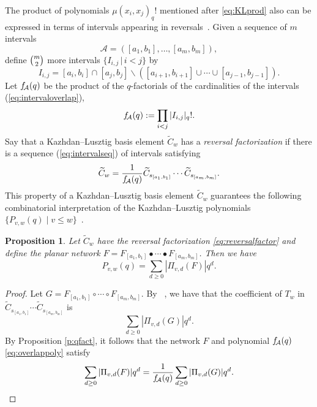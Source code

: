 \documentclass[12pt]{amsart}
\newtheorem{prop}[thm]{Proposition}
\theoremstyle{definition}
\numberwithin{equation}{section}
\newcommand{\wtc}[2]{\widetilde{C}_{#1}}
\newcommand{\defeq}{:=}
\newcommand{\ntnsp}{\negthinspace}
\newcommand{\ssm}{\smallsetminus}
\begin{document}
The product of polynomials $\mu(x_i,x_j)_q!$ 
mentioned after \eqref{eq:KLprod} also can be expressed in terms of intervals appearing in reversals~\cite[Thm.\,4.3]{SkanNNDCB}.
Given a sequence of $m$ intervals
 \begin{equation}\label{eq:intervalseq}
 \mathcal A = ([a_1,b_1], \dotsc, [a_m,b_m]),
 \end{equation}
 define $\tbinom m2$ more intervals $\{I_{i,j} \,|\, i < j \}$ by
 \begin{equation}\label{eq:intervaloverlap}
 I_{i,j} = [a_i,b_i] \cap [a_j,b_j] \ssm ( [a_{i+1},b_{i+1}] \cup \cdots \cup [a_{j-1},b_{j-1}]).
 \end{equation}
Let $f_{\ntnsp\mathcal A}(q)$ be the product of the $q$-factorials of the cardinalities of the intervals (\ref{eq:intervaloverlap}),
 \begin{equation}\label{eq:overlappoly}
 f_{\ntnsp\mathcal A}(q) \defeq \prod_{i < j} |I_{i,j}|_q!.
 \end{equation}
Say that a Kazhdan--Lusztig basis element $\wtc wq$ has a {\em reversal factorization} %
if there is a sequence (\ref{eq:intervalseq}) of intervals satisfying
\begin{equation}\label{eq:reversalfactor}
\wtc wq =
\frac1{f_{\ntnsp \mathcal A}(q)} \wtc{s_{[a_1,b_1]}}q \cdots \wtc{s_{[a_m,b_m]}}q.
\end{equation}
This property of a Kazhdan--Lusztig basis element $\wtc wq$ guarantees the following combinatorial interpretation of the Kazhdan--Lusztig polynomials $\{P_{v,w}(q) \mid v \leq w\}$~\cite[Cor.\,5.3]{CSkanTNNChar}.
\begin{prop}
    Let $\wtc wq$ have the reversal factorization \eqref{eq:reversalfactor} and define the planar network $F = F_{[a_1,b_1]} \bullet \cdots \bullet F_{[a_m,b_m]}$. 
    Then we have
    \begin{equation}
        P_{v,w}(q) = \sum_{d \geq 0} |\Pi_{v,d}(F)|q^d.
    \end{equation}
\end{prop}
\begin{proof}
    Let $G = F_{[a_1, b_1]} \circ \cdots \circ F_{[a_m, b_m]}$. By ~\cite[Cor.\,5.3]{CSkanTNNChar}, we have that the coefficient of $T_w$ in $\wtc {s_{[a_1, b_1]}}q \cdots \wtc {s_{[a_m, b_m]}}q$ is
    \begin{equation*}
        \sum_{d \geq 0} |\Pi_{v, d}(G)|q^d.
    \end{equation*}
    By Proposition \ref{p:qfact}, it follows that the network $F$
    and polynomial $f_{\ntnsp\mathcal A}(q)$ \eqref{eq:overlappoly} satisfy 
    \begin{equation*}
        \sum_{d \geq 0} |\Pi_{v, d}(F)|q^d  = \frac 1 {f_{\ntnsp\mathcal A}(q)} \sum_{d \geq 0} |\Pi_{v, d}(G)|q^d.
    \end{equation*}
\end{proof}
\end{document}
